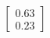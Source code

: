 \documentclass[preview]{standalone}
\begin{document}
\begin{align*}
\begin{bmatrix} 0.63 \\ 0.23 \end{bmatrix}
\end{align*}
\end{document}
